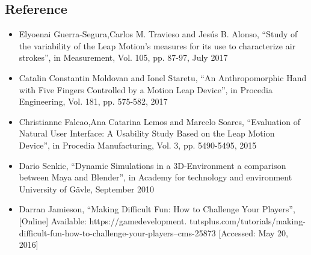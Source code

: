 \documentclass[12pt, oneside]{article}										%
\begin{document}
\begin{multicols*}{2}
    
    \section{Reference}
        \begin{itemize}
            \item[\textbf{[1]}] Elyoenai Guerra-Segura,Carlos M. Travieso and Jesús B. Alonso, “Study of the 
            variability of the Leap Motion’s measures for its use to characterize air strokes”, 
            in Measurement, Vol. 105, pp. 87-97, July 2017

            \item[\textbf{[2]}] Catalin Constantin Moldovan and Ionel Staretu, “An Anthropomorphic Hand with Five 
            Fingers Controlled by a Motion Leap Device”, in Procedia Engineering, Vol. 181, 
            pp. 575-582, 2017
            

            \item[\textbf{[3]}] Christianne Falcao,Ana Catarina Lemos and Marcelo Soares, “Evaluation of Natural User 
            Interface: A Usability Study Based on the Leap Motion Device”, 
            in Procedia Manufacturing, Vol. 3, pp. 5490-5495, 2015

            \item[\textbf{[4]}] Dario Senkic, “Dynamic Simulations in a 3D-Environment a comparison between Maya
            and Blender”, in Academy for technology and environment University of Gävle, 
            September 2010
            

            \item[\textbf{[5]}] Darran Jamieson, “Making Difficult Fun: How to Challenge Your Players”, [Online]
            Available: https://gamedevelopment.
            tutsplus.com/tutorials/making-difficult-fun-how-to-challenge-your-players--cms-25873 [Accessed: May 20, 2016]
            
        \end{itemize}

    \end{multicols*}
\end{document}
